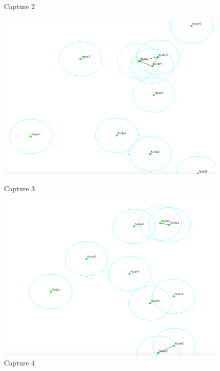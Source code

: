 \documentclass[10pt]{report}
\begin{document}
\begin{figure}[h]
\begin{center}
\begin{minipage}{0.4\textwidth}
\begin{flushright}
 		\caption[cap2]{Capture 2}
        \label{fig:Capture 2}
\end{flushright}\end{minipage}
\begin{minipage}{0.4\textwidth} \begin{flushleft}
\includegraphics[height = 0.2\textheight,width = 1\textwidth]{imgs/3.png}
 		\caption[cap1]{Capture 3}
        \label{fig:Capture 3}
\end{flushleft}\end{minipage}
\begin{minipage}{0.4\textwidth} \begin{flushright}
\includegraphics[height = 0.2\textheight,width = 1\textwidth]{imgs/4.png}
 		\caption[cap2]{Capture 4}
        \label{fig:Capture 4}
\end{flushright}\end{minipage}
\end{center}
\end{figure}
\end{document}
